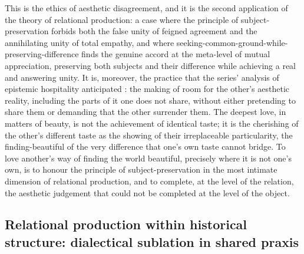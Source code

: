 This is the ethics of aesthetic disagreement, and it is the second application of the theory of relational production: a case where the principle of subject-preservation forbids both the false unity of feigned agreement and the annihilating unity of total empathy, and where seeking-common-ground-while-preserving-difference finds the genuine accord at the meta-level of mutual appreciation, preserving both subjects and their difference while achieving a real and answering unity. It is, moreover, the practice that the series' analysis of epistemic hospitality anticipated \parencite{paperxiii}: the making of room for the other's aesthetic reality, including the parts of it one does not share, without either pretending to share them or demanding that the other surrender them. The deepest love, in matters of beauty, is not the achievement of identical taste; it is the cherishing of the other's different taste as the showing of their irreplaceable particularity, the finding-beautiful of the very difference that one's own taste cannot bridge. To love another's way of finding the world beautiful, precisely where it is not one's own, is to honour the principle of subject-preservation in the most intimate dimension of relational production, and to complete, at the level of the relation, the aesthetic judgement that could not be completed at the level of the object.

\subsection{Relational production within historical structure: dialectical sublation in shared praxis}
\label{p21:sub:rp-social}

